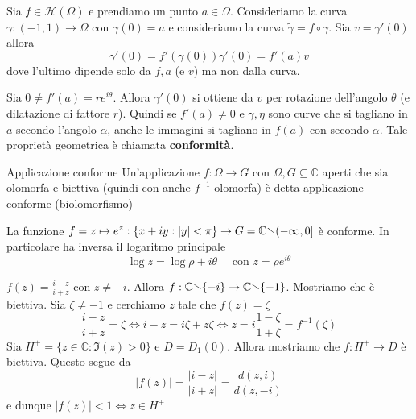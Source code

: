 Sia \(f \in \mathcal{H}{(\Omega)}\) e prendiamo un punto \(a \in \Omega\).
Consideriamo la curva \(\gamma : (-1, 1) \to \Omega\) con \(\gamma{(0)} = a\) e
consideriamo la curva \(\tilde{\gamma} = f \circ \gamma\). Sia \(v =
\gamma'{(0)}\) allora
\[
  \gamma'{(0)} = f'{(\gamma{(0)})} \gamma'{(0)} = f'{(a)} v
\]
dove l'ultimo dipende solo da \(f, a\) (e \(v\)) ma non dalla curva.

Sia \(0 \neq f'{(a)} = r e ^{i\theta}\). Allora \(\gamma'{(0)}\) si ottiene da \(v\)
per rotazione dell'angolo \(\theta\) (e dilatazione di fattore \(r\)). Quindi se
\(f'{(a)} \neq 0\) e \(\gamma, \eta\) sono curve che si tagliano in \(a\)
secondo l'angolo \(\alpha\), anche le immagini si tagliano in \(f{(a)}\) con
secondo \(\alpha\). Tale proprietà geometrica è chiamata \textbf{conformità}.

\begin{definition}{Applicazione conforme}
    Un'applicazione \(f : \Omega \to G \) con \(\Omega, G \subseteq \mathbb{C}
    \) aperti che sia olomorfa e biettiva (quindi con anche \(f^{-1}\)
    olomorfa) è detta applicazione conforme (biolomorfismo)
\end{definition}

\begin{example}
    La funzione \(f = z \mapsto e^{z} : \{x + iy : |y| < \pi\} \to G =
    \mathbb{C} \sminus (-\infty, 0]\) è conforme. In particolare ha inversa il
    logaritmo principale
    \[
        \log z = \log \rho + i \theta \quad \text{ con } z = \rho e^{i\theta}
    \]

\end{example}
\begin{example}
    \(f{(z)} = \frac{i - z}{i + z}\) con \(z \neq -i\). Allora \(f : \mathbb{C}
    \sminus \{-i\} \to \mathbb{C}\sminus \{-1\} \). Mostriamo che è biettiva.
    Sia \(\zeta \neq -1\) e cerchiamo \(z\) tale che \(f{(z)} = \zeta\)
    \[
      \frac{i - z}{i + z} = \zeta \iff i - z = i \zeta + z \zeta \iff z = i
      \frac{1 - \zeta}{1 + \zeta} = f^{-1}{(\zeta)}
    \]
    Sia \(H ^{+} = \{ z \in \mathbb{C} : \Im {(z)} > 0\} \) e \(D =
    D_{1}{(0)}\). Allora mostriamo che \(f : H^{+} \to D\) è biettiva. Questo
    segue da 
    \[
      {|f{(z)}|} = \frac{|i-z|}{|i+z|} = \frac{d{(z, i)}}{d{(z, -i)}}
    \]
    e dunque \(|f{(z)}| < 1 \iff z \in H^{+}\) 
\end{example}

